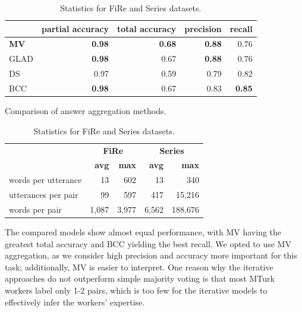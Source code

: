 \begin{table}[]
\parbox{.45\linewidth}{
\begin{adjustbox}{width=0.45\textwidth}
\begin{tabular}{@{}lrrrr@{}}
            & \textbf{partial accuracy} & \textbf{total accuracy} & \textbf{precision} & \textbf{recall} \\ \toprule
\textbf{MV} & \textbf{0.98}                    & \textbf{0.68}                  & \textbf{0.88}                 & 0.76             \\
GLAD        & \textbf{0.98}                             & 0.67                           & \textbf{0.88}                          & 0.76                       \\
DS          & 0.97                             & 0.59                           & 0.79                          & 0.82                       \\
BCC         & \textbf{0.98}                             & 0.67                           & 0.83                          & \textbf{0.85}                      
\end{tabular}
\end{adjustbox}
\caption{Comparison of answer aggregation methods.}
\label{tab:aggregation}
}
\hfill
\parbox{.47\linewidth}{
\begin{adjustbox}{width=0.46\textwidth}
\begin{tabular}{@{}lrrrr@{}}
                    & \multicolumn{2}{c}{\textbf{FiRe}} & \multicolumn{2}{c}{\textbf{Series}}                           \\
                    \cmidrule(lr){2-3} \cmidrule(l){4-5}
                    & \textbf{avg}      & \textbf{max}        & \textbf{avg}      & \textbf{max} \\ \toprule
words per utterance & 13           & 602        & 13                          & 340                     \\
utterances per pair & 99           & 597        & \multicolumn{1}{r}{417}     & 15,216                   \\
words per pair      & 1,087        & 3,977      &        6,562              &  188,676     
\end{tabular}
\end{adjustbox}
\caption{Statistics for FiRe and Series datasets.}
\label{data_stats}
}
\end{table}

The compared models show almost equal performance, with MV having the greatest total accuracy and BCC yielding the best recall. We opted to use MV aggregation, as we consider high precision and accuracy more important for this task; additionally, MV is easier to interpret. One reason why the iterative approaches do not outperform simple majority voting is that most MTurk workers label only 1-2 pairs, which is too few for the iterative models to effectively infer the workers' expertise.

